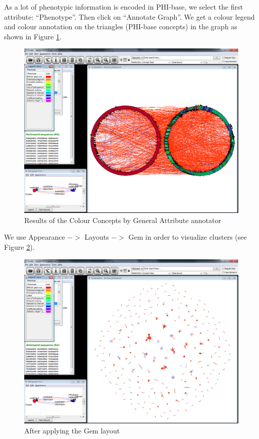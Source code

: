 As a lot of phenotypic information is encoded in PHI-base, we select the first attribute: ``Phenotype''. 
Then click on ``Annotate Graph''. 
We get a colour legend and colour annotation on the triangles (PHI-base concepts) 
in the graph as shown in Figure \ref{fig:bot_colbyval_res}.

\begin{figure}[H]
\centering
\includegraphics[scale=0.35]{images/Oct12/app2fig3.png} 
\caption{Results of the Colour Concepts by General Attribute annotator}
\label{fig:bot_colbyval_res}
\end{figure}

We use Appearance $->$ Layouts $->$ Gem in order to visualize clusters (see Figure \ref{fig:bot_gem}).

\begin{figure}[H]
\centering
\includegraphics[scale=0.35]{images/Oct12/app2fig4.png} 
\caption{After applying the Gem layout}
\label{fig:bot_gem}
\end{figure}

